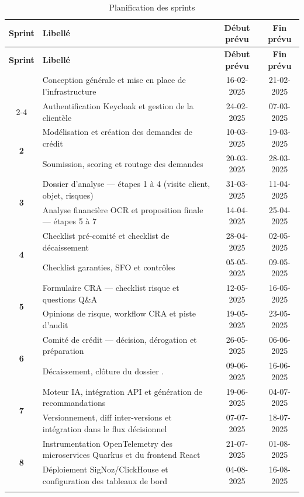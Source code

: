 \begin{longtable}{|c|p{8cm}|c|c|}
\hline
\textbf{Sprint} &
\textbf{Libellé} &
\textbf{Début prévu} &
\textbf{Fin prévu} \\
\hline
\endfirsthead
\hline
\textbf{Sprint} &
\textbf{Libellé} &
\textbf{Début prévu} &
\textbf{Fin prévu} \\
\hline
\endhead
\endlastfoot

\multirow{2}{*}{\textbf{1}}
& Conception générale et mise en place de l'infrastructure & 16-02-2025 & 21-02-2025 \\ \cline{2-4}
& Authentification Keycloak et gestion de la clientèle     & 24-02-2025 & 07-03-2025 \\ \hline

\multirow{2}{*}{\textbf{2}}
& Modélisation et création des demandes de crédit          & 10-03-2025 & 19-03-2025 \\ \cline{2-4}
& Soumission, scoring et routage des demandes              & 20-03-2025 & 28-03-2025 \\ \hline

\multirow{2}{*}{\textbf{3}}
& Dossier d'analyse — étapes 1 à 4 (visite client, objet, risques) & 31-03-2025 & 11-04-2025 \\ \cline{2-4}
& Analyse financière OCR et proposition finale — étapes 5 à 7      & 14-04-2025 & 25-04-2025 \\ \hline

\multirow{2}{*}{\textbf{4}}
& Checklist pré-comité et checklist de décaissement        & 28-04-2025 & 02-05-2025 \\ \cline{2-4}
& Checklist garanties, SFO et contrôles                   & 05-05-2025 & 09-05-2025 \\ \hline

\multirow{2}{*}{\textbf{5}}
& Formulaire CRA — checklist risque et questions Q\&A      & 12-05-2025 & 16-05-2025 \\ \cline{2-4}
& Opinions de risque, workflow CRA et piste d'audit        & 19-05-2025 & 23-05-2025 \\ \hline

\multirow{2}{*}{\textbf{6}}
& Comité de crédit — décision, dérogation et préparation   & 26-05-2025 & 06-06-2025 \\ \cline{2-4}
& Décaissement, clôture du dossier  .  & 09-06-2025 & 16-06-2025 \\ \hline

\multirow{2}{*}{\textbf{7}}
& Moteur IA, intégration API et génération de recommandations              & 19-06-2025 & 04-07-2025 \\ \cline{2-4}
& Versionnement, diff inter-versions et intégration dans le flux décisionnel & 07-07-2025 & 18-07-2025 \\ \hline

\multirow{2}{*}{\textbf{8}}
& Instrumentation OpenTelemetry des microservices Quarkus et du frontend React & 21-07-2025 & 01-08-2025 \\ \cline{2-4}
& Déploiement SigNoz/ClickHouse et configuration des tableaux de bord          & 04-08-2025 & 16-08-2025 \\ \hline

\caption{Planification des sprints}
\label{tab:sprints}
\end{longtable}

